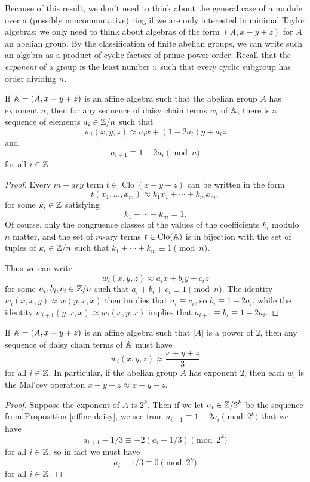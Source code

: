 \documentclass[letterpaper,11pt]{article}
\DeclareMathOperator{\Clo}{Clo}
\begin{document}
Because of this result, we don't need to think about the general case of a module over a (possibly noncommutative) ring if we are only interested in minimal Taylor algebras: we only need to think about algebras of the form $(A, x-y+z)$ for $A$ an abelian group. By the classification of finite abelian groups, we can write such an algebra as a product of cyclic factors of prime power order. Recall that the \emph{exponent} of a group is the least number $n$ such that every cyclic subgroup has order dividing $n$.

\begin{prop}\label{affine-daisy} If $\mathbb{A} = (A,x-y+z)$ is an affine algebra such that the abelian group $A$ has exponent $n$, then for any sequence of daisy chain terms $w_i$ of $\mathbb{A}$, there is a sequence of elements $a_i \in \mathbb{Z}/n$ such that
\[
w_i(x,y,z) \approx a_ix + (1-2a_i)y + a_iz
\]
and
\[
a_{i+1} \equiv 1-2a_i \pmod{n}
\]
for all $i \in \mathbb{Z}$.
\end{prop}
\begin{proof} Every $m-ary$ term $t \in \Clo(x-y+z)$ can be written in the form
\[
t(x_1, ..., x_m) \approx k_1x_1 + \cdots + k_mx_m,
\]
for some $k_i \in \mathbb{Z}$ satisfying
\[
k_1 + \cdots + k_m = 1.
\]
Of course, only the congruence classes of the values of the coefficients $k_i$ modulo $n$ matter, and the set of $m$-ary terms $t \in \Clo(\bA)$ is in bijection with the set of tuples of $k_i \in \mathbb{Z}/n$ such that $k_1 + \cdots + k_m \equiv 1 \pmod{n}$.

Thus we can write
\[
w_i(x,y,z) \approx a_ix + b_iy + c_iz
\]
for some $a_i,b_i,c_i \in \mathbb{Z}/n$ such that $a_i + b_i + c_i \equiv 1 \pmod{n}$. The identity $w_i(x,x,y) \approx w(y,x,x)$ then implies that $a_i \equiv c_i$, so $b_i \equiv 1 - 2a_i$, while the identity $w_{i+1}(y,x,x) \approx w_i(x,y,x)$ implies that $a_{i+1} \equiv b_i \equiv 1 - 2a_i$.
\end{proof}

\begin{prop} If $\mathbb{A} = (A,x-y+z)$ is an affine algebra such that $|A|$ is a power of $2$, then any sequence of daisy chain terms of $\mathbb{A}$ must have
\[
w_i(x,y,z) \approx \frac{x+y+z}{3}
\]
for all $i \in \mathbb{Z}$. In particular, if the abelian group $A$ has exponent $2$, then each $w_i$ is the Mal'cev operation $x-y+z \approx x+y+z$.
\end{prop}
\begin{proof} Suppose the exponent of $A$ is $2^k$. Then if we let $a_i \in \mathbb{Z}/2^k$ be the sequence from Proposition \ref{affine-daisy}, we see from $a_{i+1} \equiv 1 - 2a_i \pmod{2^k}$ that we have
\[
a_{i+1} - 1/3 \equiv -2(a_i - 1/3) \pmod{2^k}
\]
for all $i \in \mathbb{Z}$, so in fact we must have
\[
a_i - 1/3 \equiv 0 \pmod{2^k}
\]
for all $i \in \mathbb{Z}$.
\end{proof}
\end{document}
